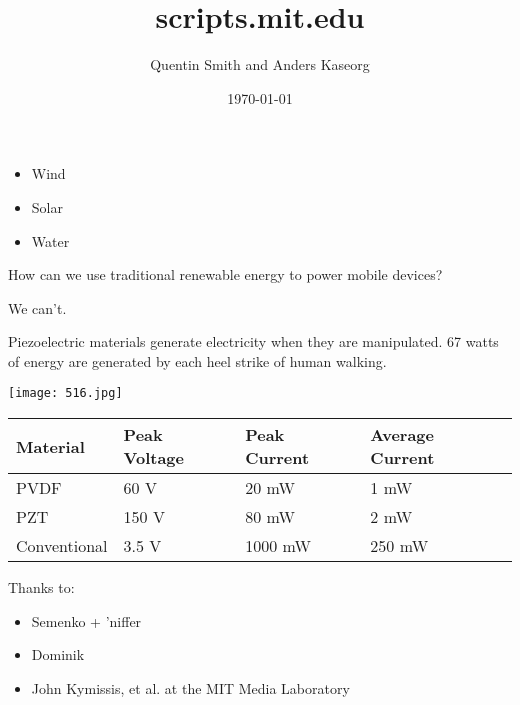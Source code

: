 \documentclass[landscape]{slides}
\title{scripts.mit.edu}
\author{Quentin Smith and Anders Kaseorg}
\date{\today}
\begin{document}
\begin{slide}
    \thispagestyle{empty}
    \maketitle
\end{slide}

\begin{slide}
  \begin{itemize}
      \item Wind
      \item Solar
      \item Water
  \end{itemize}
\end{slide}

\begin{slide}
    How can we use traditional renewable energy to power mobile devices?

    We can't.
\end{slide}

\begin{slide}
    
    Piezoelectric materials generate electricity when they are
    manipulated. 67 watts of energy are generated by each heel strike of
    human walking.

    \begin{center}
      \texttt{[image: 516.jpg]}
    \end{center}
\end{slide}

\begin{slide}

    \begin{tabular}{|l|l|l|l|}\hline
      Material & Peak Voltage & Peak Current & Average Current \\ \hline
      PVDF & 60 V & 20 mW & 1 mW \\ \hline
      PZT & 150 V & 80 mW & 2 mW \\ \hline
      Conventional & 3.5 V & 1000 mW & 250 mW \\ \hline
    \end{tabular}
\end{slide}

\begin{slide}
  
  Thanks to:

  \begin{itemize}
    \item Semenko + 'niffer
    \item Dominik
    \item John Kymissis, et al. at the MIT Media Laboratory
  \end{itemize}
\end{slide}
\end{document}

